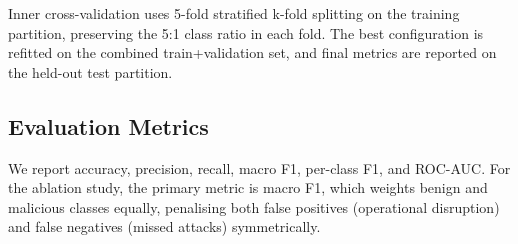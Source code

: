 Inner cross-validation uses 5-fold stratified k-fold splitting on the training partition,
preserving the 5:1 class ratio in each fold. The best configuration is refitted on the
combined train+validation set, and final metrics are reported on the held-out test
partition.

\subsection{Evaluation Metrics}

We report accuracy, precision, recall, macro F1, per-class F1, and ROC-AUC. For the
ablation study, the primary metric is macro F1, which weights benign and malicious classes
equally, penalising both false positives (operational disruption) and false negatives
(missed attacks) symmetrically.
